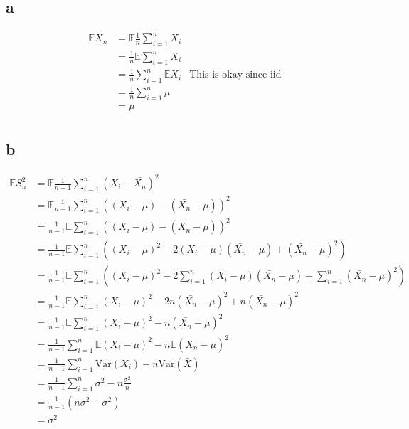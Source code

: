 \documentclass{article}
\newcommand{\expect}{\mathbb{E}}
\newcommand{\var}{\text{Var}}
\begin{document}
\subsection{a}
\begin{align*}
    \expect \bar{X}_n
    &= \expect \frac{1}{n} \sum_{i=1}^n X_i \\
    &= \frac{1}{n} \expect \sum_{i=1}^n X_i \\
    &= \frac{1}{n} \sum_{i=1}^n \expect X_i & \text{This is okay since iid} \\
    &= \frac{1}{n} \sum_{i=1}^n \mu \\
    &= \mu \\
\end{align*}

\subsection{b}
\begin{align*}
    \expect S^2_n
    &= \expect \frac{1}{n-1} \sum_{i=1}^n {(X_i - \bar{X_n})}^2 \\
    &= \expect \frac{1}{n-1} \sum_{i=1}^n {((X_i - \mu) - (\bar{X_n} - \mu))}^2 \\
    &= \frac{1}{n-1} \expect \sum_{i=1}^n {((X_i - \mu) - (\bar{X_n} - \mu))}^2 \\
    &= \frac{1}{n-1} \expect
        \sum_{i=1}^n ({(X_i - \mu)}^2 - 2 (X_i - \mu) (\bar{X_n} - \mu)
        + {(\bar{X_n} - \mu)}^2) \\
    &= \frac{1}{n-1} \expect
        \sum_{i=1}^n ({(X_i - \mu)}^2 - 2 \sum_{i=1}^n (X_i - \mu) (\bar{X_n} - \mu)
        + \sum_{i=1}^n {(\bar{X_n} - \mu)}^2) \\
    &= \frac{1}{n-1} \expect
        \sum_{i=1}^n {(X_i - \mu)}^2 - 2 n {(\bar{X_n} - \mu)}^2
        + n{(\bar{X_n} - \mu)}^2 \\
    &= \frac{1}{n-1} \expect
        \sum_{i=1}^n {(X_i - \mu)}^2 - n {(\bar{X_n} - \mu)}^2 \\
    &= \frac{1}{n-1}
        \sum_{i=1}^n \expect {(X_i - \mu)}^2 - n \expect {(\bar{X_n} - \mu)}^2 \\
    &= \frac{1}{n-1}
        \sum_{i=1}^n \var(X_i) - n \var(\bar{X}) \\
    &= \frac{1}{n-1}
        \sum_{i=1}^n \sigma^2 - n \frac{\sigma^2}{n} \\
    &= \frac{1}{n-1}
        \left(n \sigma^2 - \sigma^2\right) \\
    &= \sigma^2
\end{align*}
\end{document}
